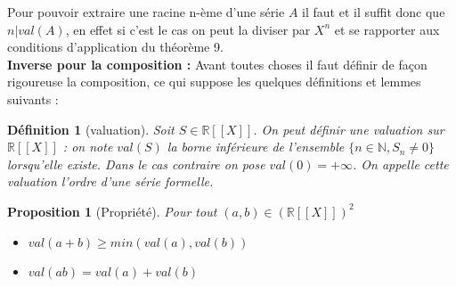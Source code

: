 \documentclass[12pt,a4paper]{amsart}
\newtheorem{prop}[thm]{\bf Proposition}
\newtheorem{defn}[thm]{\bf D\'efinition}
\begin{document}
Pour pouvoir extraire une racine n-ème d'une série $A$ il faut et il suffit donc que $n|val(A)$, en effet si c'est le cas on peut la diviser par $X^{n}$ et se rapporter aux conditions d'application du théorème 9. \\


\textbf{Inverse pour la composition : } Avant toutes choses il faut définir de façon rigoureuse la composition, ce qui suppose les quelques définitions et lemmes suivants : 

\begin{defn}[valuation]
Soit $S\in \mathbb{R}[[X]]$. On peut définir une valuation sur $\mathbb{R}[[X]]$ : on note $val(S)$ la borne inférieure de l'ensemble $\{n\in \mathbb{N},S_{n}\neq 0\}$ lorsqu'elle existe. Dans le cas contraire on pose $val(0)=+\infty$. On appelle cette valuation l'ordre d'une série formelle. 

\end{defn}
\begin{prop}[Propriété]
Pour tout $(a,b)\in (\mathbb{R}[[X]])^{2}$
\begin{itemize}
\item $val(a+b)\geq min(val(a),val(b))$
\item $val(ab)=val(a)+val(b)$
\end{itemize}
\end{prop}
\end{document}
